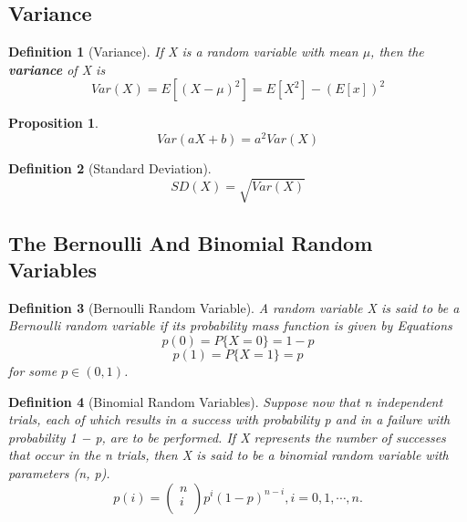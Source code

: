 \documentclass[12pt]{article}
\newtheorem{definition}{Definition}[subsection]
\newtheorem{proposition}{Proposition}[subsection]
\begin{document}
        \subsection{Variance}
        \begin{definition}[Variance]
            If X is a random variable with mean $\mu$, then the \textbf{variance} of X is
            \[Var(X) = E[(X - \mu)^2] = E[X^2]-(E[x])^2\]
        \end{definition}
        \begin{proposition}
            \[Var(aX + b) = a^2Var(X)\]
        \end{proposition}
        \begin{definition}[Standard Deviation]
            \[SD(X) = \sqrt{Var(X)}\]
        \end{definition}
        \subsection{The Bernoulli And Binomial Random Variables}
        \begin{definition}[Bernoulli Random Variable]
            A random variable X is said to be a Bernoulli random variable if its probability mass function is given by Equations
            \[p(0) = P\{X = 0\} = 1 - p\]
            \[p(1) = P\{X = 1\} = p\]
            for some $p \in (0, 1)$.
        \end{definition}
        \begin{definition}[Binomial Random Variables]
        Suppose now that n independent trials, each of which results in a success with probability p and in a failure with probability 1 − p, are to be performed. If X represents the number of successes that occur in the n trials, then X is said to be a binomial random variable with parameters (n, p).
        \[p(i) = \left(\begin{array}{c} n\\ i\\ \end{array}\right) p^i(1 - p)^{n - i}, i = 0, 1, \cdots, n.\]
        \end{definition}
\end{document}

